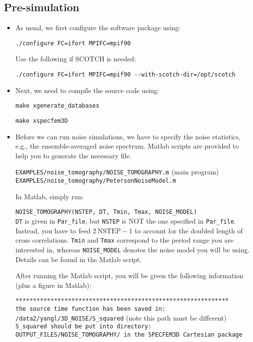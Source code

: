 \subsection{Pre-simulation}
\begin{itemize}
\item As usual, we first configure the software package using:


\texttt{./configure FC=ifort MPIFC=mpif90}


Use the following if SCOTCH is needed:


\texttt{./configure FC=ifort MPIFC=mpif90 -{}-with-scotch-dir=/opt/scotch}\\


\item Next, we need to compile the source code using:


\texttt{make xgenerate\_databases}


\texttt{make xspecfem3D} \\


\item Before we can run noise simulations, we have to specify the noise
statistics, e.g., the ensemble-averaged noise spectrum. Matlab scripts
are provided to help you to generate the necessary file.


\texttt{EXAMPLES/noise\_tomography/NOISE\_TOMOGRAPHY.m} (main program)\\
 \texttt{EXAMPLES/noise\_tomography/PetersonNoiseModel.m}


In Matlab, simply run:


\texttt{NOISE\_TOMOGRAPHY(NSTEP, DT, Tmin, Tmax, NOISE\_MODEL)}\\



\texttt{DT} is given in \texttt{Par\_file}, but \texttt{NSTEP} is
NOT the one specified in \texttt{Par\_file}. Instead, you have to
feed $2~\mathrm{NSTEP}-1$ to account for the doubled length of cross
correlations. \texttt{Tmin} and \texttt{Tmax} correspond to the period
range you are interested in, whereas \texttt{NOISE\_MODEL} denotes
the noise model you will be using. Details can be found in the Matlab
script.


After running the Matlab script, you will be given the following information
(plus a figure in Matlab):


\texttt{{*}{*}{*}{*}{*}{*}{*}{*}{*}{*}{*}{*}{*}{*}{*}{*}{*}{*}{*}{*}{*}{*}{*}{*}{*}{*}{*}{*}{*}{*}{*}{*}{*}{*}{*}{*}{*}{*}{*}{*}{*}{*}{*}{*}{*}{*}{*}{*}{*}{*}{*}{*}{*}{*}{*}{*}{*}{*}{*}{*}{*}}\\
 \texttt{the source time function has been saved in:}\\
 \texttt{/data2/yangl/3D\_NOISE/S\_squared} (note this path must be
different)\\
 \texttt{S\_squared should be put into directory:}\\
 \texttt{OUTPUT\_FILES/NOISE\_TOMOGRAPHY/ in the SPECFEM3D Cartesian
package}\\




\end{itemize}
